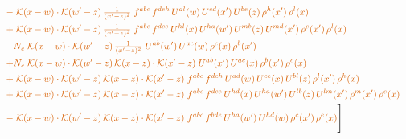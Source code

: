 \documentclass[10pt]{article}
\numberwithin{equation}{section}
\begin{document}
\begin{align}
&\quad{\color{BFK}-\;\mathcal{K}(x-w)\cdot\mathcal{K}(w'-z)\,\tfrac{1}{(x'-z)^{2}}\;f^{abc}\,f^{deh}\,U^{al}(w)\,U^{cd}(x')\,U^{be}(z)\,\rho^{h}(x')\,\rho^{l}(x)}\notag\\
&\quad{\color{BFK}+\;\mathcal{K}(x-w)\cdot\mathcal{K}(w'-z)\,\tfrac{1}{(x'-z)^{2}}\;f^{abc}\,f^{dce}\,U^{hl}(x)\,U^{ha}(w')\,U^{mb}(z)\,U^{md}(x')\,\rho^{e}(x')\,\rho^{l}(x)}\notag\\
&\quad{\color{BFK}-N_c\;\mathcal{K}(x-w)\cdot\mathcal{K}(w'-z)\,\tfrac{1}{(x'-z)^{2}}\;U^{ab}(w')\,U^{ac}(w)\,\rho^{c}(x)\,\rho^{b}(x')}\notag\\
&\quad{\color{BFK}+N_c\;\mathcal{K}(x-w)\cdot\mathcal{K}(w'-z)\,\mathcal{K}(x-z)\cdot\mathcal{K}(x'-z)\;U^{ab}(x')\,U^{ac}(x)\,\rho^{b}(x')\,\rho^{c}(x)}\notag\\
&\quad{\color{BFK}+\;\mathcal{K}(x-w)\cdot\mathcal{K}(w'-z)\,\mathcal{K}(x-z)\cdot\mathcal{K}(x'-z)\;f^{abc}\,f^{deh}\,U^{ad}(w)\,U^{ce}(x)\,U^{bl}(z)\,\rho^{l}(x')\,\rho^{h}(x)}\notag\\
&\quad{\color{BFK}+\;\mathcal{K}(x-w)\cdot\mathcal{K}(w'-z)\,\mathcal{K}(x-z)\cdot\mathcal{K}(x'-z)\;f^{abc}\,f^{dce}\,U^{hd}(x)\,U^{ha}(w')\,U^{lb}(z)\,U^{lm}(x')\,\rho^{m}(x')\,\rho^{e}(x)}\notag\\
&\quad{\color{BFK}-\;\mathcal{K}(x-w)\cdot\mathcal{K}(w'-z)\,\mathcal{K}(x-z)\cdot\mathcal{K}(x'-z)\;f^{abc}\,f^{bde}\,U^{ha}(w')\,U^{hd}(w)\,\rho^{c}(x')\,\rho^{e}(x)}\Bigg]\label{eq:P3}
\end{align}
\end{document}
